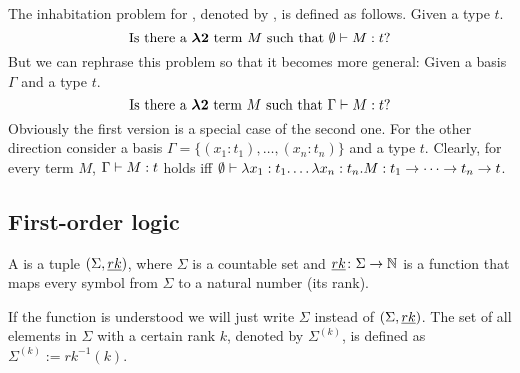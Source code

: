 \begin{definition}\label{def.2.14}
The inhabitation problem for \lambdaTwo{}, denoted by \lambdaInhab, is defined as follows. Given a \lambdaTwo{} type $t$.
\[\text{Is there a \ensuremath{\boldsymbol{\lambda2}}{} term $M$ such that } \emptyset\vdash M:t?\]
But we can rephrase this problem so that it becomes more general:
Given a basis $\Gamma$ and a \lambdaTwo{} type $t$.
\[\text{Is there a \ensuremath{\boldsymbol{\lambda2}}{} term $M$ such that } \Gamma\vdash M:t?\]
Obviously the first version is a special case of the second one. For the other direction consider a basis $\Gamma=\{(x_1:t_1),\dots,(x_n:t_n)\}$ and a \lambdaTwo{} type $t$. Clearly, for every term $M$, $\Gamma\vdash M:t$ holds iff $\emptyset\vdash \lambda x_1:t_1.\dots\lambda x_n:t_n.M:t_1\to\dots\to t_n\to t$.
\end{definition}
\subsection{First-order logic}
\begin{definition}\label{def.2.15}
	A  is a tuple $(\Sigma,\emph{rk})$, where $\Sigma$ is a countable set and $\emph{rk}\colon\Sigma\to\mathbb{N}$ is a function that maps every symbol from $\Sigma$ to a natural number (its rank).
\end{definition}
If the function \rank{} is understood we will just write $\Sigma$ instead of $(\Sigma,\emph{rk})$. The set of all elements in $\Sigma$ with a certain rank $k$, denoted by $\Sigma^{(k)}$, is defined as $\Sigma^{(k)}:=rk^{-1}(k)$. 


